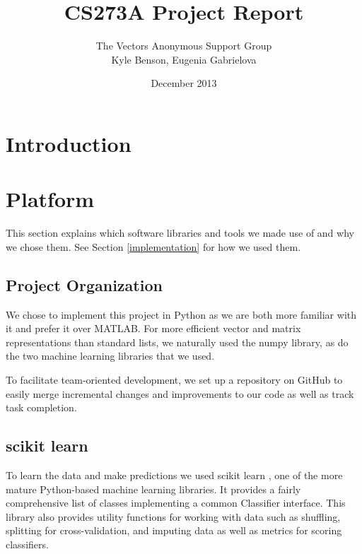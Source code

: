 \documentclass{article}
\title{CS273A Project Report}
\author{The Vectors Anonymous Support Group\\Kyle Benson, Eugenia Gabrielova}
\date{December 2013}
\begin{document}
\maketitle


\section{Introduction}



\section{Platform}

This section explains which software libraries and tools we made use of and why we chose them.
See Section \ref{implementation} for how we used them.

\subsection{Project Organization}
We chose to implement this project in Python as we are both more familiar with it and prefer it over MATLAB\textregistered.
For more efficient vector and matrix representations than standard lists, we naturally used the numpy library, as do the two machine learning libraries that we used.

To facilitate team-oriented development, we set up a repository on GitHub to easily merge incremental changes and improvements to our code as well as track task completion.

\subsection{scikit learn}


To learn the data and make predictions we used scikit learn \cite{pedregosa2011scikit}, one of the more mature Python-based machine learning libraries.
It provides a fairly comprehensive list of classes implementing a common Classifier interface.
This library also provides utility functions for working with data such as shuffling, splitting for cross-validation, and imputing data as well as metrics for scoring classifiers.
\end{document}
